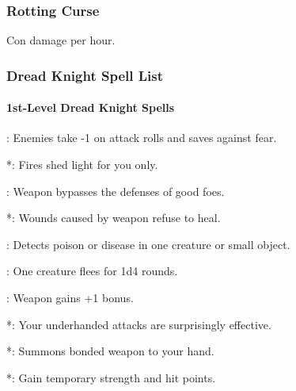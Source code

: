 \subsubsection{Rotting Curse}
Con damage per hour.

\subsubsection{Dread Knight Spell List}
\paragraph{1st-Level Dread Knight Spells}
\begin{list}{}{\leftmargin=1em}
\item {}: Enemies take -1 on attack rolls and saves against fear.%
\item {}*: Fires shed light for you only. %
\item {}: Weapon bypasses the defenses of good foes. %
\item {}*: Wounds caused by weapon refuse to heal. %
\item {}: Detects poison or disease in one creature or small object.
\item {}: One creature flees for 1d4 rounds. %
\item {}: Weapon gains +1 bonus.
\item {}*: Your underhanded attacks are surprisingly effective. %
\item {}*: Summons bonded weapon to your hand.
\item {}*: Gain temporary strength and hit points.
\end{list}
